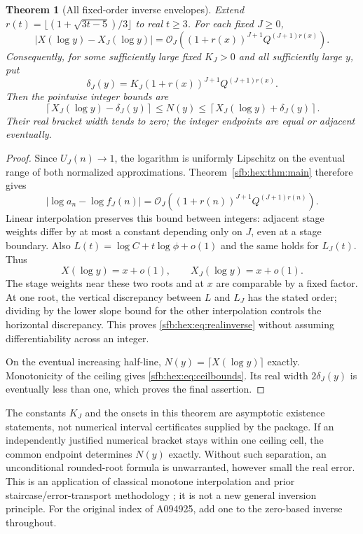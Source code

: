 \documentclass[11pt]{article}
\newtheorem{theorem}{Theorem}[section]
\theoremstyle{remark}\newtheorem{remark}[theorem]{Remark}
\newcommand{\OO}{\mathcal O}
\newcommand{\ceil}[1]{\left\lceil #1\right\rceil}
\begin{document}
\begin{theorem}[All fixed-order inverse envelopes]\label{sfb:hex:thm:inverse}
Extend $r(t)=\lfloor(1+\sqrt{3t-5})/3\rfloor$ to real $t\ge3$. For each fixed $J\ge0$,
\begin{equation}\label{sfb:hex:eq:realinverse}
 |X(\log y)-X_J(\log y)|
 =\OO_J\!\left((1+r(x))^{J+1}Q^{(J+1)r(x)}\right).
\end{equation}
Consequently, for some sufficiently large fixed $K_J>0$ and all sufficiently large $y$, put
\begin{equation}\label{sfb:hex:eq:delta}
 \delta_J(y)=K_J(1+r(x))^{J+1}Q^{(J+1)r(x)}.
\end{equation}
Then the pointwise integer bounds are
\begin{equation}\label{sfb:hex:eq:ceilbounds}
 \ceil{X_J(\log y)-\delta_J(y)}
 \le N(y)\le
 \ceil{X_J(\log y)+\delta_J(y)}.
\end{equation}
Their real bracket width tends to zero; the integer endpoints are equal or adjacent eventually.
\end{theorem}
\begin{proof}
Since $U_J(n)\to1$, the logarithm is uniformly Lipschitz on the eventual range of both normalized approximations. Theorem~\ref{sfb:hex:thm:main} therefore gives
\[
 |\log a_n-\log f_J(n)|
 =\OO_J((1+r(n))^{J+1}Q^{(J+1)r(n)}).
\]
Linear interpolation preserves this bound between integers: adjacent stage weights differ by at most a constant depending only on $J$, even at a stage boundary. Also $L(t)=\log C+t\log\phi+o(1)$ and the same holds for $L_J(t)$. Thus
\[
 X(\log y)=x+o(1),\qquad X_J(\log y)=x+o(1).
\]
The stage weights near these two roots and at $x$ are comparable by a fixed factor. At one root, the vertical discrepancy between $L$ and $L_J$ has the stated order; dividing by the lower slope bound for the other interpolation controls the horizontal discrepancy. This proves \eqref{sfb:hex:eq:realinverse} without assuming differentiability across an integer.

On the eventual increasing half-line, $N(y)=\lceil X(\log y)\rceil$ exactly. Monotonicity of the ceiling gives \eqref{sfb:hex:eq:ceilbounds}. Its real width $2\delta_J(y)$ is eventually less than one, which proves the final assertion.
\end{proof}

The constants $K_J$ and the onsets in this theorem are asymptotic existence statements, not numerical interval certificates supplied by the package. If an independently justified numerical bracket stays within one ceiling cell, the common endpoint determines $N(y)$ exactly. Without such separation, an unconditional rounded-root formula is unwarranted, however small the real error. This is an application of classical monotone interpolation and prior staircase/error-transport methodology \cite{proveit}; it is not a new general inversion principle. For the original index of A094925, add one to the zero-based inverse throughout.
\end{document}
